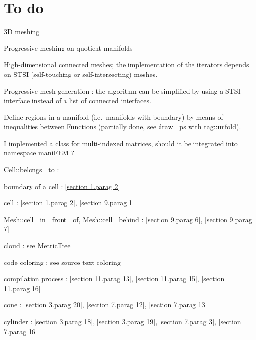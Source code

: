 \documentclass[a4paper]{scrreprt}
\def\numb{}
\newcommand\verm[1]{\textcolor{manif}{#1}}
\renewcommand\tt{\normalfont\ttfamily}
\begin{document}
\section*{To do}

\noindent 3D meshing

\noindent Progressive meshing on quotient manifolds

\noindent High-dimensional connected meshes; the implementation of the iterators depends
on STSI (self-touching or self-intersecting) meshes.

\noindent Progressive mesh generation : the algorithm can be simplified by using
a STSI interface instead of a list of connected interfaces.

\noindent Define regions in a manifold (i.e.\ manifolds with boundary) by means of
inequalities between {\small\tt\verm{Function}}s (partially done, see {\small\tt draw\_\,ps}
with {\small\tt\textcolor{tag}{tag}::unfold}).

\noindent I implemented a class for multi-indexed matrices, should it be integrated into
{\small\tt namespace} {\small\tt\verm{maniFEM}} ?





\noindent
{\small\tt\verm{Cell}::belongs\_\,to} : 

\noindent
boundary of a cell : \ref{\numb section 1.\numb parag 2}

\noindent
cell : \ref{\numb section 1.\numb parag 2}, \ref{\numb section 9.\numb parag 1}

\noindent
{\small\tt\verm{Mesh}::cell\_\,in\_\,front\_\,of},
{\small\tt\verm{Mesh}::cell\_\,behind} : \ref{\numb section 9.\numb parag 6},
\ref{\numb section 9.\numb parag 7}

\noindent
cloud : see {\small\tt\verm{MetricTree}}

\noindent
code coloring : see source text coloring


\noindent
compilation process : \ref{\numb section 11.\numb parag 13},
\ref{\numb section 11.\numb parag 15}, \ref{\numb section 11.\numb parag 16}

\noindent
cone : \ref{\numb section 3.\numb parag 20}, \ref{\numb section 7.\numb parag 12},
\ref{\numb section 7.\numb parag 13}

\noindent
cylinder : \ref{\numb section 3.\numb parag 18}, \ref{\numb section 3.\numb parag 19},
\ref{\numb section 7.\numb parag 3}, \ref{\numb section 7.\numb parag 16}
\end{document}
